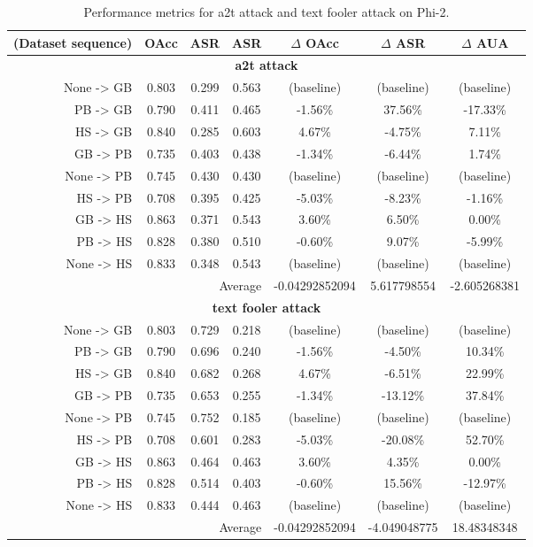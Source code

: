 \documentclass{article}
\begin{document}
\begin{table}[ht]
\centering
\caption{Performance metrics for a2t attack and text fooler attack on Phi-2.}
\small
\begin{tabular}{r|ccc|ccc}
\hline
\textbf{(Dataset sequence)} & \textbf{OAcc} & \textbf{ASR} & \textbf{ASR} & \textbf{$\Delta$ OAcc} & \textbf{$\Delta$ ASR} & \textbf{$\Delta$ AUA} \\ \hline
\multicolumn{7}{c}{\textbf{a2t attack}} \\ \hline
None -> GB & 0.803 & 0.299 & 0.563 & (baseline) & (baseline) & (baseline) \\
PB -> GB & 0.790 & 0.411 & 0.465 & -1.56\% & 37.56\% & -17.33\% \\
HS -> GB & 0.840 & 0.285 & 0.603 & 4.67\% & -4.75\% & 7.11\% \\
GB -> PB & 0.735 & 0.403 & 0.438 & -1.34\% & -6.44\% & 1.74\% \\
None -> PB & 0.745 & 0.430 & 0.430 & (baseline) & (baseline) & (baseline) \\
HS -> PB & 0.708 & 0.395 & 0.425 & -5.03\% & -8.23\% & -1.16\% \\
GB -> HS & 0.863 & 0.371 & 0.543 & 3.60\% & 6.50\% & 0.00\% \\
PB -> HS & 0.828 & 0.380 & 0.510 & -0.60\% & 9.07\% & -5.99\% \\
None -> HS & 0.833 & 0.348 & 0.543 & (baseline) & (baseline) & (baseline) \\ \hline
\multicolumn{4}{r|}{Average} & -0.04292852094 & 5.617798554 & -2.605268381 \\ \hline
\multicolumn{7}{c}{\textbf{text fooler attack}} \\ \hline
None -> GB & 0.803 & 0.729 & 0.218 & (baseline) & (baseline) & (baseline) \\
PB -> GB & 0.790 & 0.696 & 0.240 & -1.56\% & -4.50\% & 10.34\% \\
HS -> GB & 0.840 & 0.682 & 0.268 & 4.67\% & -6.51\% & 22.99\% \\
GB -> PB & 0.735 & 0.653 & 0.255 & -1.34\% & -13.12\% & 37.84\% \\
None -> PB & 0.745 & 0.752 & 0.185 & (baseline) & (baseline) & (baseline) \\
HS -> PB & 0.708 & 0.601 & 0.283 & -5.03\% & -20.08\% & 52.70\% \\
GB -> HS & 0.863 & 0.464 & 0.463 & 3.60\% & 4.35\% & 0.00\% \\
PB -> HS & 0.828 & 0.514 & 0.403 & -0.60\% & 15.56\% & -12.97\% \\
None -> HS & 0.833 & 0.444 & 0.463 & (baseline) & (baseline) & (baseline) \\ \hline
\multicolumn{4}{r|}{Average} & -0.04292852094 & -4.049048775 & 18.48348348 \\ \hline
\end{tabular}
\label{table:phi2_attack_comparison}
\end{table}
\end{document}
